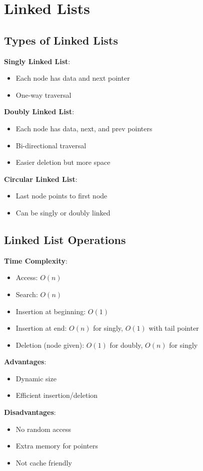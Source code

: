 \documentclass[12pt,a4paper]{report}
\begin{document}
\section{Linked Lists}

\subsection{Types of Linked Lists}
\begin{concept}
\textbf{Singly Linked List}:
\begin{itemize}
    \item Each node has data and next pointer
    \item One-way traversal
\end{itemize}

\textbf{Doubly Linked List}:
\begin{itemize}
    \item Each node has data, next, and prev pointers
    \item Bi-directional traversal
    \item Easier deletion but more space
\end{itemize}

\textbf{Circular Linked List}:
\begin{itemize}
    \item Last node points to first node
    \item Can be singly or doubly linked
\end{itemize}
\end{concept}

\subsection{Linked List Operations}
\begin{concept}
\textbf{Time Complexity}:
\begin{itemize}
    \item Access: $O(n)$
    \item Search: $O(n)$
    \item Insertion at beginning: $O(1)$
    \item Insertion at end: $O(n)$ for singly, $O(1)$ with tail pointer
    \item Deletion (node given): $O(1)$ for doubly, $O(n)$ for singly
\end{itemize}

\textbf{Advantages}:
\begin{itemize}
    \item Dynamic size
    \item Efficient insertion/deletion
\end{itemize}

\textbf{Disadvantages}:
\begin{itemize}
    \item No random access
    \item Extra memory for pointers
    \item Not cache friendly
\end{itemize}
\end{concept}
\end{document}
